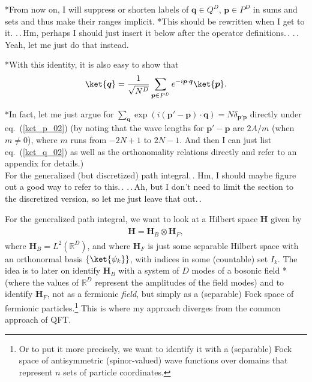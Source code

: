 \documentclass{report}
\begin{document}
*From now on, I will suppress or shorten labels of $\boldsymbol{q}\in Q^D$, $\boldsymbol{p}\in P^D$ in sums and sets and thus make their ranges implicit. *This should be rewritten when I get to it. .\,.\,Hm, perhaps I should just insert it below after the operator definitions.\,. .\,.\,Yeah, let me just do that instead.

*With this identity, it is also easy to show that
\begin{align}
\begin{aligned}
	\ket{\boldsymbol{q}} = \frac{1}{\sqrt{N^{D}}} 
		\sum_{\boldsymbol{p}\in P^D}
		e^{-i \boldsymbol{p} \cdot \boldsymbol{q}} 
		\ket{\boldsymbol{p}}.
	\label{ket_q_02}
\end{aligned}
\end{align}

*In fact, let me just argue for 
$\sum_{\boldsymbol{q}} 
\exp(i (\boldsymbol{p}' - \boldsymbol{p}) \cdot \boldsymbol{q}) 
= N\delta_{\boldsymbol{p}' \boldsymbol{p}}$ 
directly under eq.\ (\ref{ket_p_02}) (by noting that the wave lengths for $\boldsymbol{p}' - \boldsymbol{p}$ are $2A/m$ (when $m\neq 0$), where $m$ runs from $-2N+1$ to $2N-1$. And then I can just list eq.\ (\ref{ket_q_02}) as well as the orthonomality relations directly and refer to an appendix for details.)\\


For the generalized (but discretized) path integral.\,. Hm, I should maybe figure out a good way to refer to this.\,. .\,.\,Ah, but I don't need to limit the section to the discretized version, so let me just leave that out.\,.

For the generalized path integral, we want to look at a Hilbert space $\textbf{H}$ given by
\begin{align}
\begin{aligned}
	\textbf{H} = \textbf{H}_{B} \otimes \textbf{H}_{F},
\end{aligned}
\end{align} 
where $\textbf{H}_B = L^2(\mathbb{R}^D)$, and where $\textbf{H}_F$ is just some separable Hilbert space 
with an orthonormal basis %
$\{\ket{\psi_k}\}%
$, with indices in some (countable) set $I_k$. The idea is to later on identify $\textbf{H}_{B}$ with a system of $D$ modes of a bosonic field *(where the values of $\mathbb{R}^D$ represent the amplitudes of the field modes) and to identify $\textbf{H}_{F}$, not as a fermionic \emph{field}, but simply as a (separable) Fock space of fermionic particles.\footnote{
	Or to put it more precisely, we want to identify it with a (separable) Fock space of antisymmetric (spinor-valued) wave functions over domains that represent $n$ sets of particle coordinates.
} 
This is where my approach diverges from the common approach of QFT. 
\end{document}
